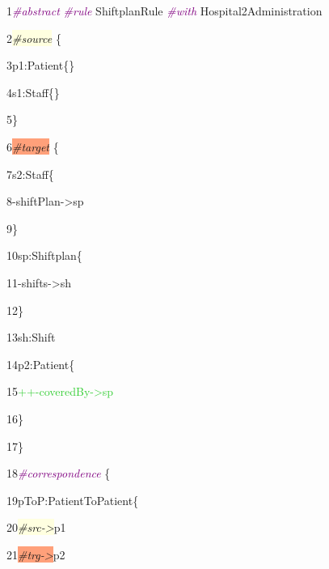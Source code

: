 {

1\hspace{0.5cm}\textcolor{Purple}{\textit{\#abstract}} \textcolor{Purple}{\textit{\#rule}} ShiftplanRule \textcolor{Purple}{\textit{\#with}} Hospital2Administration

2\hspace{0.5cm}\colorbox{LightYellow}{\textit{\#source}} \{

3\hspace{1cm}p1:Patient\{\}

4\hspace{1cm}s1:Staff\{\}
	
5\hspace{0.5cm}\}

6\hspace{0.5cm}\colorbox{LightSalmon}{\textit{\#target}} \{
	
7\hspace{1cm}s2:Staff\{

8\hspace{1.5cm}-shiftPlan->sp

9\hspace{1cm}\}

10\hspace{1cm}sp:Shiftplan\{

11\hspace{1.5cm}-shifts->sh

12\hspace{1cm}\}

13\hspace{1cm}sh:Shift

14\hspace{1cm}p2:Patient\{

15\hspace{1.5cm}\textcolor{LimeGreen}{++-coveredBy->sp}

16\hspace{1cm}\}

17\hspace{0.5cm}\}

18\hspace{0.5cm}\textcolor{Purple}{\textit{\#correspondence}} \{
		
19\hspace{1cm}pToP:PatientToPatient\{

20\hspace{1.5cm}\colorbox{LightYellow}{\textit{\#src->}}p1

21\hspace{1.5cm}\colorbox{LightSalmon}{\textit{\#trg->}}p2

}
